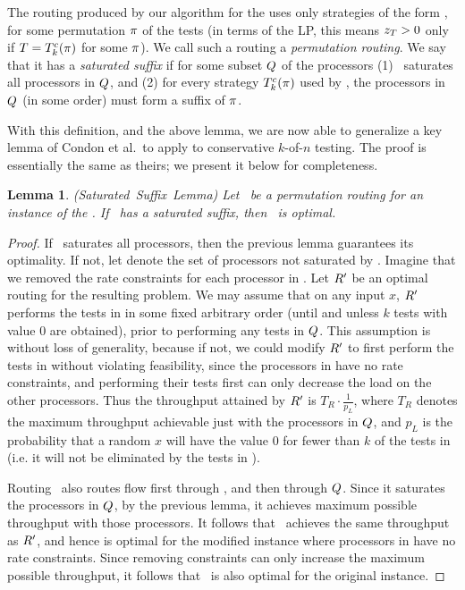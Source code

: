 \documentclass{article}
\newcounter{thmcount}
\newcounter{ass}
\newtheorem{lem}[thmcount]{Lemma}
\newcommand{\ens}[1]{\ensuremath{#1}}					\newcommand{\card}[1]{\ens{|#1|}}							\newcommand{\dotlist}[2]{\ens{#1,\ldots,#2}}
\newcommand{\anitem}{\ens{x}}
\newcommand{\valn}{\ens{n}}
\newcommand{\valk}{\ens{k}}
\newcommand{\kofn}{\valk-of-\valn}
\newcommand{\strategy}{\ens{T}}
\newcommand{\processor}{processor}
\begin{document}
The routing produced by our algorithm for the \cmt{}
uses only strategies of the form \cstrat{\valk}{\perm}, for some permutation $\perm$ of the tests
(in terms of the LP, this means $\varz{\strategy} > 0$ only if $\strategy = \cstrat{k}{\perm}$ for some $\perm$).
We call such a routing a {\em permutation routing}. We say that it has a {\em saturated suffix}
if for some subset $\satsuff$ of the {\processor}s (1)
\routing\ saturates all {\processor}s in $\satsuff$, and 
(2) for every strategy $\cstrat{\valk}{\perm}$ used by \routing, the {\processor}s in $\satsuff$ (in some order) must form a suffix of $\perm$.

With this definition, and the above lemma, we are now able to generalize a key lemma of Condon et al.~to apply to conservative \kofn{} testing.  The proof is essentially the same as theirs; we present it 
below for completeness.

\begin{lem}
\label{saturatedsuffix}
(\mbox{Saturated Suffix Lemma})  Let \routing\ be a permutation routing for an instance of the \cmt.
If \routing\ has a saturated suffix, then \routing\ is optimal.
\end{lem}

\begin{proof}
If \routing\ saturates all {\processor}s, then the previous lemma guarantees its optimality.
If not, let \unsat{} denote the set of {\processor}s not saturated by \routing.
Imagine that we removed the rate constraints for each {\processor} in \unsat.  
Let $\routing'$ be
an optimal routing for the resulting problem.
We may assume that on any input \anitem, $\routing'$ performs the tests in \unsat{} in some fixed arbitrary order
(until and unless $\valk$ tests with value 0 are obtained), 
prior to performing any tests in $\satsuff$.
This assumption is without loss of generality, because 
if not, we could modify $\routing'$ to first perform the tests in \unsat{}
without violating feasibility, since the {\processor}s in \unsat{} have no rate constraints,
and performing their tests first can only decrease the load on the other {\processor}s.
Thus the throughput attained by $\routing'$ is $T_R \cdot \frac{1}{p_L}$,
where $T_R$ denotes the maximum throughput achievable just with the {\processor}s
in $\satsuff$, and $p_L$ is the probability that a random \anitem{} will have the value 0
for fewer than $\valk$ of the tests in \unsat{} (i.e. it will not be eliminated by the
tests in \unsat).

Routing \routing\ also routes flow first through \unsat, and then through $\satsuff$. 
Since it saturates the {\processor}s in $\satsuff$, by the previous lemma, 
it achieves maximum possible throughput with those {\processor}s.
It follows that \routing\ achieves the same throughput as $\routing'$, and hence is optimal
for the modified instance where {\processor}s in \unsat{}
have no rate constraints.  Since removing constraints can only increase the maximum
possible throughput, it follows that \routing\ is also optimal for the original
instance.
\end{proof}
\end{document}
